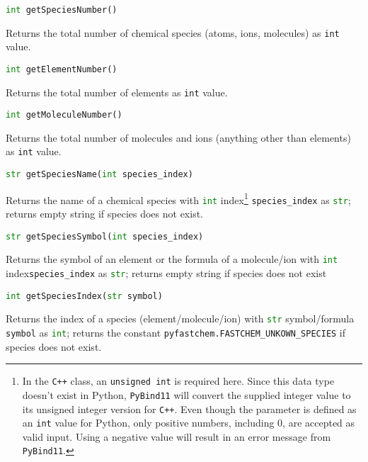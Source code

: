 \documentclass[numbers=noenddot]{fcmanual}
\newcommand{\cpp}{\ttt{C++}\xspace}
\newcommand{\pb}{\texttt{PyBind11}\xspace}
\newcommand{\ttt}[1]{\texttt {#1}}
\begin{document}
\bigbreak

\lstinline[language=Python]!int getSpeciesNumber()!
\begin{addmargin}[25pt]{0pt}
	Returns the total number of chemical species (atoms, ions, molecules) as \lstinline!int! value.
\end{addmargin}

\bigbreak

\lstinline[language=Python]!int getElementNumber()!
\begin{addmargin}[25pt]{0pt}
	Returns the total number of elements as \lstinline!int! value.
\end{addmargin}

\bigbreak

\lstinline[language=Python]!int getMoleculeNumber()!
\begin{addmargin}[25pt]{0pt}
	Returns the total number of molecules and ions (anything other than elements) as \lstinline!int! value.
\end{addmargin}

\bigbreak

\lstinline[language=Python]!str getSpeciesName(int species_index)!
\begin{addmargin}[25pt]{0pt}
	Returns the name of a chemical species with \lstinline[language=Python]!int! index\footnote{In the \cpp class, an \lstinline!unsigned int! is required here. Since this data type doesn't exist in Python, \pb will convert the supplied integer value to its unsigned integer version for \cpp. Even though the parameter is defined as an \lstinline!int! value for Python, only positive numbers, including 0, are accepted as valid input. Using a negative value will result in an error message from \pb.} \lstinline!species_index! as \lstinline[language=Python]!str!; returns empty string if species does not exist.
\end{addmargin}  

\bigbreak

\lstinline[language=Python]!str getSpeciesSymbol(int species_index)!
\begin{addmargin}[25pt]{0pt}
	Returns the symbol of an element or the formula of a molecule/ion with \lstinline[language=Python]!int! index\footnotemark[\value{footnote}] \lstinline!species_index! as \lstinline[language=Python]!str!; returns empty string if species does not exist
\end{addmargin}

\bigbreak

\lstinline[language=Python]!int getSpeciesIndex(str symbol)!
\begin{addmargin}[25pt]{0pt}
	Returns the index of a species (element/molecule/ion) with \lstinline[language=Python]!str! symbol/formula \lstinline!symbol! as \lstinline[language=Python]!int!; returns the constant \lstinline!pyfastchem.FASTCHEM_UNKOWN_SPECIES! if species does not exist.
\end{addmargin}
\end{document}

